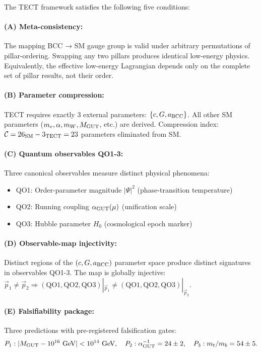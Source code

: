 \begin{theorem}
\label{thm:stage2}
The TECT framework satisfies the following five conditions:

\paragraph{(A) Meta-consistency:}
The mapping BCC → SM gauge group is valid under arbitrary permutations of pillar-ordering.
Swapping any two pillars produces identical low-energy physics. Equivalently, the effective
low-energy Lagrangian depends only on the complete set of pillar results, not their order.

\paragraph{(B) Parameter compression:}
TECT requires exactly 3 external parameters: $\{c, G, a_{\rm BCC}\}$. All other SM
parameters ($m_e, \alpha, m_W, M_{\rm GUT}$, etc.) are derived. Compression index:
$\mathcal{C} = 26_{\rm SM} - 3_{\rm TECT} = 23$ parameters eliminated from SM.

\paragraph{(C) Quantum observables QO1-3:}
Three canonical observables measure distinct physical phenomena:
\begin{itemize}
\item QO1: Order-parameter magnitude $|\Psi|^2$ (phase-transition temperature)
\item QO2: Running coupling $\alpha_{\rm GUT}(\mu)$ (unification scale)
\item QO3: Hubble parameter $H_0$ (cosmological epoch marker)
\end{itemize}

\paragraph{(D) Observable-map injectivity:}
Distinct regions of the $(c, G, a_{\rm BCC})$ parameter space produce distinct signatures
in observables QO1-3. The map is globally injective: $\vec{p}_1 \neq \vec{p}_2 \Rightarrow
(\text{QO}1, \text{QO}2, \text{QO}3)|_{\vec{p}_1} \neq (\text{QO}1, \text{QO}2, \text{QO}3)|_{\vec{p}_2}$.

\paragraph{(E) Falsifiability package:}
Three predictions with pre-registered falsification gates:
\begin{equation}
P_1: |M_{\rm GUT} - 10^{16} \text{ GeV}| < 10^{14} \text{ GeV}, \quad
P_2: \alpha_{\rm GUT}^{-1} = 24 \pm 2, \quad
P_3: m_t / m_b = 54 \pm 5.
\end{equation}
\end{theorem}

